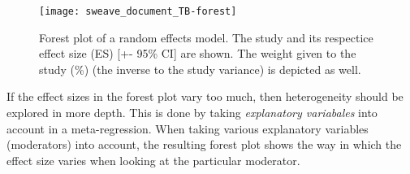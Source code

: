 \documentclass[11pt, a4paper]{article}
\begin{document}
\begin{figure}[!h]
\captionsetup{width=0.6\textwidth}
\centering
\texttt{[image: sweave\_document\_TB-forest]}
\caption{Forest plot of a random effects model. The study and its respectice effect size (ES) [+- 95\% CI] are shown. The weight given to the study (\%) (the inverse to the study variance) is depicted as well.}
\label{fig:forestplot}
\end{figure}

If the effect sizes in the forest plot vary too  much, then heterogeneity should be explored in more depth. This is done by taking \emph{explanatory variabales} into account in a meta-regression. When taking various explanatory variables (moderators) into account, the resulting forest plot shows the way in which the effect size varies when looking at the particular moderator. 


\bigskip
\bigskip

\end{document}
